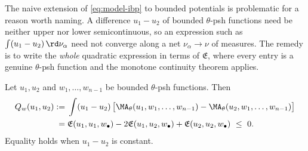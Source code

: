 The naive extension of \eqref{eq:model-ibp} to bounded potentials is
problematic for a reason worth naming.  A difference $u_1-u_2$ of bounded
$\theta$-psh functions need be neither upper nor lower semicontinuous,
so an expression such as $\int(u_1-u_2)\,\rd\nu_\alpha$ need not converge
along a net $\nu_\alpha\to\nu$ of measures.  The remedy is to write the
\emph{whole} quadratic expression in terms of $\mathfrak E$, where every
entry is a genuine $\theta$-psh function and the monotone continuity
theorem applies.

\begin{proposition}
\label{prop:ch24-bounded-dirichlet}
Let $u_1,u_2$ and $w_1,\ldots,w_{n-1}$ be bounded $\theta$-psh
functions.  Then
\begin{equation}
\label{eq:ch24-bounded-dirichlet}
\begin{split}
 Q_w(u_1,u_2)
 :={}&\int(u_1-u_2)\,
   \bigl[\MA_\theta(u_1,w_1,\ldots,w_{n-1})
        -\MA_\theta(u_2,w_1,\ldots,w_{n-1})\bigr]\\
 ={}&\mathfrak E(u_1,u_1,w_\bullet)-2\mathfrak E(u_1,u_2,w_\bullet)
     +\mathfrak E(u_2,u_2,w_\bullet)\ \leq\ 0 .
\end{split}
\end{equation}
Equality holds when $u_1-u_2$ is constant.
\end{proposition}

